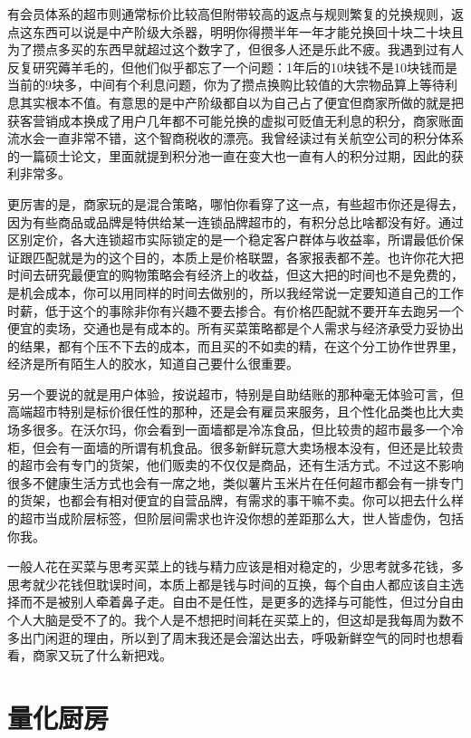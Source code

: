 \documentclass[
  letterpaper,
  DIV=11,
  numbers=noendperiod]{scrreprt}
\begin{document}
有会员体系的超市则通常标价比较高但附带较高的返点与规则繁复的兑换规则，返点这东西可以说是中产阶级大杀器，明明你得攒半年一年才能兑换回十块二十块且为了攒点多买的东西早就超过这个数字了，但很多人还是乐此不疲。我遇到过有人反复研究薅羊毛的，但他们似乎都忘了一个问题：1年后的10块钱不是10块钱而是当前的9块多，中间有个利息问题，你为了攒点换购比较值的大宗物品算上等待利息其实根本不值。有意思的是中产阶级都自以为自己占了便宜但商家所做的就是把获客营销成本换成了用户几年都不可能兑换的虚拟可贬值无利息的积分，商家账面流水会一直非常不错，这个智商税收的漂亮。我曾经读过有关航空公司的积分体系的一篇硕士论文，里面就提到积分池一直在变大也一直有人的积分过期，因此的获利非常多。

更厉害的是，商家玩的是混合策略，哪怕你看穿了这一点，有些超市你还是得去，因为有些商品或品牌是特供给某一连锁品牌超市的，有积分总比啥都没有好。通过区别定价，各大连锁超市实际锁定的是一个稳定客户群体与收益率，所谓最低价保证跟匹配就是为的这个目的，本质上是价格联盟，各家报表都不差。也许你花大把时间去研究最便宜的购物策略会有经济上的收益，但这大把的时间也不是免费的，是机会成本，你可以用同样的时间去做别的，所以我经常说一定要知道自己的工作时薪，低于这个的事除非你有兴趣不要去掺合。有价格匹配就不要开车去跑另一个便宜的卖场，交通也是有成本的。所有买菜策略都是个人需求与经济承受力妥协出的结果，都有个压不下去的成本，而且买的不如卖的精，在这个分工协作世界里，经济是所有陌生人的胶水，知道自己要什么很重要。

另一个要说的就是用户体验，按说超市，特别是自助结账的那种毫无体验可言，但高端超市特别是标价很任性的那种，还是会有雇员来服务，且个性化品类也比大卖场多很多。在沃尔玛，你会看到一面墙都是冷冻食品，但比较贵的超市最多一个冷柜，但会有一面墙的所谓有机食品。很多新鲜玩意大卖场根本没有，但还是比较贵的超市会有专门的货架，他们贩卖的不仅仅是商品，还有生活方式。不过这不影响很多不健康生活方式也会有一席之地，类似薯片玉米片在任何超市都会有一排专门的货架，也都会有相对便宜的自营品牌，有需求的事干嘛不卖。你可以把去什么样的超市当成阶层标签，但阶层间需求也许没你想的差距那么大，世人皆虚伪，包括你我。

一般人花在买菜与思考买菜上的钱与精力应该是相对稳定的，少思考就多花钱，多思考就少花钱但耽误时间，本质上都是钱与时间的互换，每个自由人都应该自主选择而不是被别人牵着鼻子走。自由不是任性，是更多的选择与可能性，但过分自由个人大脑是受不了的。我个人是不想把时间耗在买菜上的，但这却是我每周为数不多出门闲逛的理由，所以到了周末我还是会溜达出去，呼吸新鲜空气的同时也想看看，商家又玩了什么新把戏。

\section{量化厨房}\label{ux91cfux5316ux53a8ux623f}
\end{document}
